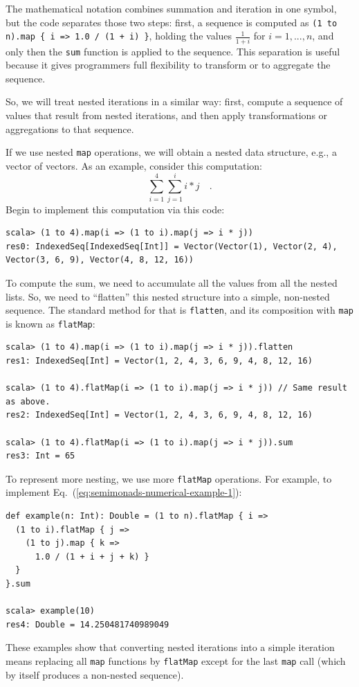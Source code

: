 The mathematical notation combines summation and iteration in one
symbol, but the code separates those two steps: first, a sequence
is computed as \lstinline!(1 to n).map { i => 1.0 / (1 + i) }!, holding
the values $\frac{1}{1+i}$ for $i=1,...,n$, and only then the \lstinline!sum!
function is applied to the sequence. This separation is useful because
it gives programmers full flexibility to transform or to aggregate
the sequence.

So, we will treat nested iterations in a similar way: first, compute
a sequence of values that result from nested iterations, and then
apply transformations or aggregations to that sequence.

If we use nested \lstinline!map! operations, we will obtain a nested
data structure, e.g., a vector of vectors. As an example, consider
this computation:
\[
\sum_{i=1}^{4}\sum_{j=1}^{i}i*j\quad.
\]
Begin to implement this computation via this code:
\begin{lstlisting}
scala> (1 to 4).map(i => (1 to i).map(j => i * j))
res0: IndexedSeq[IndexedSeq[Int]] = Vector(Vector(1), Vector(2, 4), Vector(3, 6, 9), Vector(4, 8, 12, 16))
\end{lstlisting}
To compute the sum, we need to accumulate all the values from all
the nested lists. So, we need to \textsf{``}flatten\textsf{''} this nested structure
into a simple, non-nested sequence. The standard method for that is
\lstinline!flatten!, and its composition with \lstinline!map! is
known as \lstinline!flatMap!:
\begin{lstlisting}
scala> (1 to 4).map(i => (1 to i).map(j => i * j)).flatten
res1: IndexedSeq[Int] = Vector(1, 2, 4, 3, 6, 9, 4, 8, 12, 16)

scala> (1 to 4).flatMap(i => (1 to i).map(j => i * j)) // Same result as above.
res2: IndexedSeq[Int] = Vector(1, 2, 4, 3, 6, 9, 4, 8, 12, 16)

scala> (1 to 4).flatMap(i => (1 to i).map(j => i * j)).sum
res3: Int = 65
\end{lstlisting}

To represent more nesting, we use more \lstinline!flatMap! operations.
For example, to implement Eq.~(\ref{eq:semimonads-numerical-example-1}):
\begin{lstlisting}
def example(n: Int): Double = (1 to n).flatMap { i =>
  (1 to i).flatMap { j =>
    (1 to j).map { k => 
      1.0 / (1 + i + j + k) }
  }
}.sum

scala> example(10)
res4: Double = 14.250481740989049
\end{lstlisting}
These examples show that converting nested iterations into a simple
iteration means replacing all \lstinline!map! functions by \lstinline!flatMap!
except for the last \lstinline!map! call (which by itself produces
a non-nested sequence).

